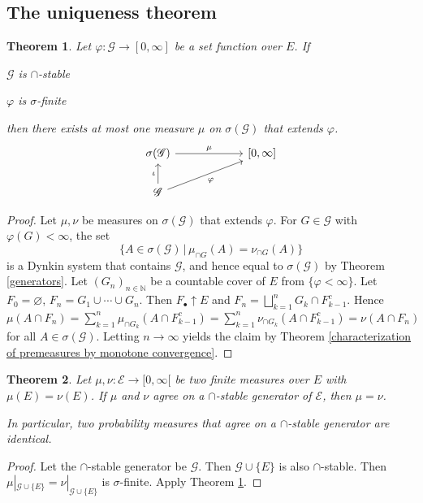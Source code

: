\documentclass[11pt, a4paper, openany]{book}
\newtheorem{thm}{Theorem}\newtheorem{lem}{Lemma}\newtheorem{crl}{Corollary}
\theoremstyle{definition}
\newenvironment{tight_enumerate}{\begin{enumerate}\itemsep -0.2em}{\end{enumerate}}
\begin{document}
\subsection{The uniqueness theorem}
    \begin{thm}\label{uniqueness theorem}
        Let $\varphi:\mathscr{G}\rightarrow [0,\infty]$ be a set function over $E$. If
        \begin{tight_enumerate}
            \item $\mathscr{G}$ is $\cap$-stable
            \item $\varphi$ is $\sigma$-finite%
        \end{tight_enumerate}
        then there exists at most one measure $\mu$ on $\sigma(\mathscr{G})$ that extends $\varphi$.
        \[
            \begin{tikzcd}[column sep = 60pt]
                \sigma(\mathscr{G}) \ar[r, "\mu"] & {[0,\infty]} \\
                \mathscr{G} \ar[u, "\iota"] \ar[ur, "\varphi"'] &
            \end{tikzcd}
        \]
    \end{thm}
    \begin{proof}
        Let $\mu,\nu$ be measures on $\sigma(\mathscr{G})$ that extends $\varphi$. For $G\in\mathscr{G}$ with $\varphi(G)<\infty$, the set \[
        \{A\in\sigma(\mathscr{G})\,|\,\mu_{\cap G}(A)=\nu_{\cap G}(A)\}\]
        is a Dynkin system that contains $\mathscr{G}$, and hence equal to $\sigma(\mathscr{G})$ by Theorem \ref{generators}. Let $(G_n)_{n\in\mathbb{N}}$ be a countable cover of $E$ from $\{\varphi<\infty\}$. Let $F_0=\varnothing$, $F_n=G_1\cup\cdots\cup G_n$. Then $F_\bullet\uparrow E$ and $F_n=\bigsqcup_{k=1}^n G_k\cap F_{k-1}^c$. Hence $\mu(A\cap F_n)=\sum_{k=1}^n\mu_{\cap G_k}(A\cap F_{k-1}^c)=\sum_{k=1}^n\nu_{\cap G_k}(A\cap F_{k-1}^c)=\nu(A\cap F_n)$ for all $A\in\sigma(\mathscr{G})$. Letting $n\to\infty$ yields the claim by Theorem \ref{characterization of premeasures by monotone convergence}.
    \end{proof}
    \begin{thm}\label{uniqueness theorem for finite measures}
        Let $\mu,\nu:\mathscr{E}\rightarrow [0,\infty[$ be two finite measures over $E$ with $\mu(E)=\nu(E)$. If $\mu$ and $\nu$ agree on a $\cap$-stable generator of $\mathscr{E}$, then $\mu=\nu$.

        In particular, two probability measures that agree on a $\cap$-stable generator are identical.
    \end{thm}
    \begin{proof}
        Let the $\cap$-stable generator be $\mathscr{G}$. Then $\mathscr{G}\cup\{E\}$ is also $\cap$-stable. Then $\mu|_{\mathscr{G}\cup\{E\}}=\nu|_{\mathscr{G}\cup\{E\}}$ is $\sigma$-finite. Apply Theorem \ref{uniqueness theorem}.
    \end{proof}
\end{document}
